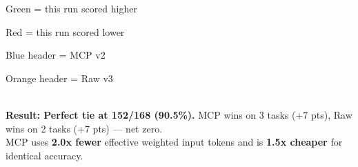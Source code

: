 \documentclass[landscape,a3paper]{article}
\begin{document}
\vspace{10pt}

\begin{center}
\small
\colorbox{win!40}{\strut\kern4pt Green = this run scored higher\kern4pt}
\quad
\colorbox{lose!40}{\strut\kern4pt Red = this run scored lower\kern4pt}
\quad
\colorbox{mcp!80}{\strut\kern4pt Blue header = MCP v2\kern4pt}
\quad
\colorbox{raw!80}{\strut\kern4pt Orange header = Raw v3\kern4pt}
\\[8pt]
\textbf{Result: Perfect tie at 152/168 (90.5\%).} MCP wins on 3 tasks (+7 pts), Raw wins on 2 tasks (+7 pts) --- net zero.\\
MCP uses \textbf{2.0x fewer} effective weighted input tokens and is \textbf{1.5x cheaper} for identical accuracy.
\end{center}
\end{document}
